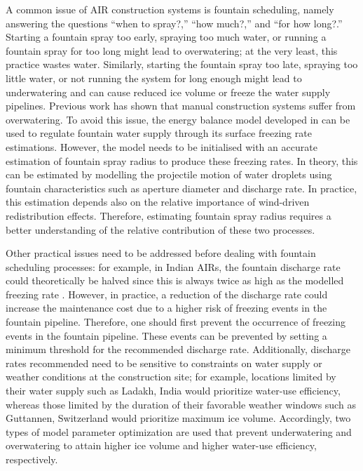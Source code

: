 \documentclass[tc, manuscript]{copernicus}
\begin{document}
A common issue of AIR construction systems is fountain scheduling, namely answering the questions “when to
spray?,” “how much?,” and “for how long?.” Starting a fountain spray too early, spraying too much water, or
running a fountain spray for too long might lead to overwatering; at the very least, this practice wastes water.
Similarly, starting the fountain spray too late, spraying too little water, or not running the system for long
enough might lead to underwatering and can cause reduced ice volume or freeze the water supply pipelines.
Previous work \citep{balasubramanianInfluenceMeteorologicalConditions2022} has shown that manual construction
systems suffer from overwatering. To avoid this issue, the energy balance model developed in
\cite{balasubramanianInfluenceMeteorologicalConditions2022} can be used to regulate fountain water supply
through its surface freezing rate estimations. However, the model needs to be initialised with an accurate
estimation of fountain spray radius to produce these freezing rates. In theory, this can be estimated by
modelling the projectile motion of water droplets using fountain characteristics such as aperture diameter and
discharge rate. In practice, this estimation depends also on the relative importance of wind-driven
redistribution effects. Therefore, estimating fountain spray radius requires a better understanding of the
relative contribution of these two processes. 

Other practical issues need to be addressed before dealing with fountain scheduling processes: for example, in
Indian AIRs, the fountain discharge rate could theoretically be halved since this is always twice as high as the
modelled freezing rate \citep{balasubramanianInfluenceMeteorologicalConditions2022}. However, in practice, a
reduction of the discharge rate could increase the maintenance cost due to a higher risk of freezing events in
the fountain pipeline. Therefore, one should first prevent the occurrence of freezing events in the fountain
pipeline. These events can be prevented by setting a minimum threshold for the recommended discharge rate.
Additionally, discharge rates recommended need to be sensitive to constraints on water supply or weather
conditions at the construction site; for example, locations limited by their water supply such as Ladakh, India
would prioritize water-use efficiency, whereas those limited by the duration of their favorable weather windows
such as Guttannen, Switzerland would prioritize maximum ice volume. Accordingly, two types of model parameter
optimization are used that prevent underwatering and overwatering to attain higher ice volume and higher
water-use efficiency, respectively. 
\end{document}
